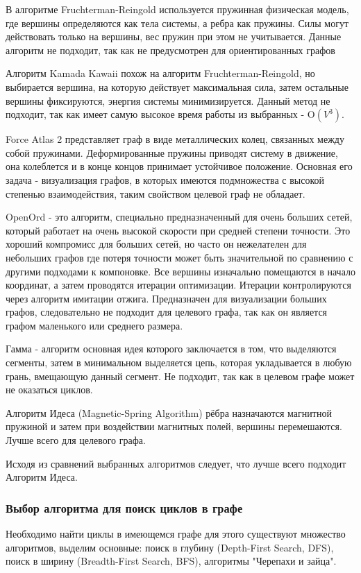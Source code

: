 В алгоритме Fruchterman-Reingold используется пружинная физическая модель, где вершины определяются как тела системы, а ребра как пружины. Силы могут действовать только на вершины, вес пружин при этом не учитывается. Данные алгоритм не подходит, так как не предусмотрен для ориентированных графов

Алгоритм Kamada Kawaii похож на алгоритм Fruchterman-Reingold, но выбирается вершина, на которую действует максимальная сила, затем остальные вершины фиксируются, энергия системы минимизируется. Данный метод не подходит, так как имеет самую высокое время работы из выбранных - O$(V^3)$.

Force Atlas 2 представляет граф в виде металлических колец, связанных между собой пружинами. Деформированные пружины приводят систему в движение, она колеблется и в конце концов принимает устойчивое положение. Основная его задача - визуализация графов, в которых имеются подмножества с высокой степенью взаимодействия, таким свойством целевой граф не обладает.

OpenOrd - это алгоритм, специально предназначенный для очень больших сетей, который работает на очень высокой скорости при средней степени точности. Это хороший компромисс для больших сетей, но часто он нежелателен для небольших графов где потеря точности может быть значительной по сравнению с другими подходами к компоновке. Все вершины изначально помещаются в начало координат, а затем проводятся итерации оптимизации. Итерации контролируются через алгоритм имитации отжига. Предназначен для визуализации больших графов, следовательно не подходит для целевого графа, так как он является графом маленького или среднего размера.

Гамма - алгоритм основная идея которого заключается в том, что выделяются сегменты, затем в минимальном выделяется цепь, которая укладывается в любую грань, вмещающую данный сегмент. Не подходит, так как в целевом графе может не оказаться циклов.

Алгоритм Идеса (Magnetic-Spring Algorithm) рёбра назначаются магнитной пружиной и затем при воздействии магнитных полей, вершины перемешаются. Лучше всего для целевого графа.

Исходя из сравнений выбранных алгоритмов следует, что лучше всего подходит Алгоритм Идеса.

\subsubsection{Выбор алгоритма для поиск циклов в графе}
Необходимо найти циклы в имеющемся графе для этого существуют множество алгоритмов, выделим основные: поиск в глубину (Depth-First Search, DFS), поиск в ширину (Breadth-First Search, BFS), алгоритмы "Черепахи и зайца".

